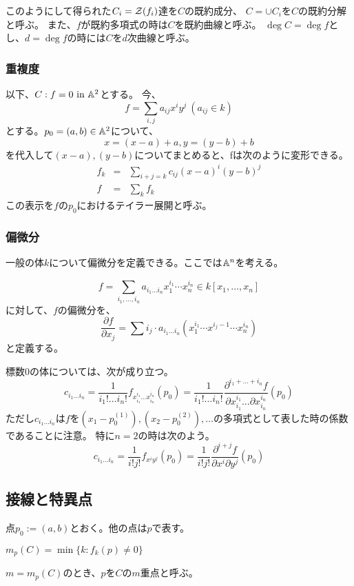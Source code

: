 \documentclass[a4paper]{jsarticle}
\begin{document}
    このようにして得られた$C_i=\mathcal{Z}(f_i)$達を$C$の既約成分、
    $C=\cup {C_i}$を$C$の既約分解と呼ぶ。
    また、$f$が既約多項式の時は$C$を既約曲線と呼ぶ。
    $\deg C=\deg f$とし、$d=\deg f$の時には$C$を$d$次曲線と呼ぶ。

    \subsubsection{重複度}
    以下、$C:f=0 ~\mbox{in}~ \mathbb{A}^2$とする。
    今、
    \[ f=\sum_{i,j}{a_{ij} x^i y^j} ~ (a_{ij} \in k)\]
    とする。$p_0=(a,b) \in \mathbb{A}^2$について、
    \[ x=(x-a)+a, y=(y-b)+b\]
    を代入して$(x-a), (y-b)$についてまとめると、fは次のように変形できる。
    \begin{eqnarray*}
        f_k&=&\sum_{i+j=k}{c_{ij}(x-a)^i(y-b)^j} \\
        f&=&\sum_{k}{f_k}
    \end{eqnarray*}
    この表示を$f$の$p_0$におけるテイラー展開と呼ぶ。

        \subsubsection{偏微分}
        一般の体$k$について偏微分を定義できる。ここでは$\mathbb{A}^n$を考える。
        \begin{Def}[偏微分]
        \[ f=\sum_{i_1, \dots, i_n} {a_{ i_1 \dots i_n } x^{i_1}_1 \dotsm x^{i_n}_n} \in k[x_1, \dots, x_n]\]
        に対して、$f$の偏微分を、
        \[ \frac{\partial f}{\partial x_{j}}=\sum{i_j \cdot a_{ i_1 \dots i_n } (x^{i_1}_1 \dotsm x^{i_j-1} \dotsm x^{i_n}_n) } \]
        と定義する。
        \end{Def}

        標数0の体については、次が成り立つ。
        \[
            c_{i_1 \dots i_n}
            =\frac{1}{i_1! \dots i_n!} f_{x_{i_1}^{i_1} \dots x_{i_n}^{i_n}}(p_0)
            =\frac{1}{i_1! \dots i_n!} \frac{\partial^{i_1+\dots+i_n} f}{\partial x_{i_1}^{i_1} \dots \partial x_{i_n}^{i_n}}(p_0)
        \]
        ただし$c_{i_1 \dots i_n}$は$f$を$(x_1-p_0^{(1)}), (x_2-p_0^{(2)}), \dots$の多項式として表した時の係数であることに注意。
        特に$n=2$の時は次のよう。
        \[
            c_{i_1 \dots i_n}
            =\frac{1}{i! j!} f_{x^{i} y^j}(p_0)
            =\frac{1}{i! j!} \frac{\partial^{i+j} f}{\partial x^i \partial y^j}(p_0)
        \]

    \subsection{接線と特異点}
    点$p_0:=(a,b)$とおく。他の点は$p$で表す。
    \begin{Def}[$C$の$p$に於ける重複度]
        $m_p(C)=\min\{k : f_k(p) \neq 0\}$
    \end{Def}
    $m=m_p(C)$のとき、$p$を$C$の$m$重点と呼ぶ。
\end{document}
